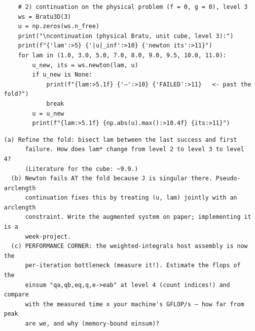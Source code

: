 \begin{lstlisting}
    # 2) continuation on the physical problem (f = 0, g = 0), level 3
    ws = Bratu3D(3)
    u = np.zeros(ws.n_free)
    print("\ncontinuation (physical Bratu, unit cube, level 3):")
    print(f"{'lam':>5} {'|u|_inf':>10} {'newton its':>11}")
    for lam in (1.0, 3.0, 5.0, 7.0, 8.0, 9.0, 9.5, 10.0, 11.0):
        u_new, its = ws.newton(lam, u)
        if u_new is None:
            print(f"{lam:>5.1f} {'—':>10} {'FAILED':>11}   <- past the fold?")
            break
        u = u_new
        print(f"{lam:>5.1f} {np.abs(u).max():>10.4f} {its:>11}")
\end{lstlisting}

\begin{explore}
\begin{verbatim}
(a) Refine the fold: bisect lam between the last success and first
      failure. How does lam* change from level 2 to level 3 to level 4?
      (Literature for the cube: ~9.9.)
  (b) Newton fails AT the fold because J is singular there. Pseudo-arclength
      continuation fixes this by treating (u, lam) jointly with an arclength
      constraint. Write the augmented system on paper; implementing it is a
      week-project.
  (c) PERFORMANCE CORNER: the weighted-integrals host assembly is now the
      per-iteration bottleneck (measure it!). Estimate the flops of the
      einsum "qa,qb,eq,q,e->eab" at level 4 (count indices!) and compare
      with the measured time x your machine's GFLOP/s — how far from peak
      are we, and why (memory-bound einsum)?
\end{verbatim}
\end{explore}
